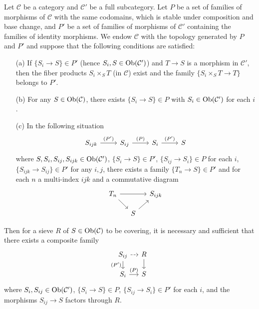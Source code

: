 \begin{proposition}\label{site topology generated by refining family prop}
Let $\mathcal{C}$ be a category and $\mathcal{C}'$ be a full subcategory. Let $P$ be a set of families of morphisms of $\mathcal{C}$ with the same codomains, which is stable under composition and base change, and $P'$ be a set of families of morphisms of $\mathcal{C}'$ containing the families of identity morphisms. We endow $\mathcal{C}$ with the topology generated by $P$ and $P'$ and suppose that the following conditions are satisfied:
\begin{enumerate}
    \item[(a)] If $\{S_i\to S\}\in P'$ (hence $S_i,S\in\mathrm{Ob}(\mathcal{C}')$) and $T\to S$ is a morphism in $\mathcal{C}'$, then the fiber products $S_i\times_ST$ (in $\mathcal{C}$) exist and the family $\{S_i\times_ST\to T\}$ belongs to $P'$.
    \item[(b)] For any $S\in\mathrm{Ob}(\mathcal{C})$, there exists $\{S_i\to S\}\in P$ with $S_i\in\mathrm{Ob}(\mathcal{C}')$ for each $i$.
    \item[(c)] In the following situation
    \[\begin{tikzcd}
    S_{ijk}\ar[r,"(P')"]&S_{ij}\ar[r,"(P)"]&S_i\ar[r,"(P')"]&S
    \end{tikzcd}\]
    where $S,S_i,S_{ij},S_{ijk}\in\mathrm{Ob}(\mathcal{C}')$, $\{S_i\to S\}\in P'$, $\{S_{ij}\to S_i\}\in P$ for each $i$, $\{S_{ijk}\to S_{ij}\}\in P'$ for any $i,j$, there exists a family $\{T_n\to S\}\in P'$ and for each $n$ a multi-index $ijk$ and a commutative diagram
    \[\begin{tikzcd}[row sep=4mm, column sep=4mm]
    T_n\ar[rd]\ar[rr]&&S_{ijk}\\
    &S\ar[ru]&
    \end{tikzcd}\]
\end{enumerate}
Then for a sieve $R$ of $S\in\mathrm{Ob}(\mathcal{C})$ to be covering, it is necessary and sufficient that there exists a composite family
\begin{equation}\label{site topology generated by refining family prop-1}
\begin{tikzcd}[row sep=4mm, column sep=4mm]
S_{ij}\ar[d,swap,"(P')"]\ar[r,dashed]&R\ar[d]\\
S_i\ar[r,"(P)"]&S
\end{tikzcd}
\end{equation}
where $S_i,S_{ij}\in\mathrm{Ob}(\mathcal{C}')$, $\{S_i\to S\}\in P$, $\{S_{ij}\to S_i\}\in P'$ for each $i$, and the morphisms $S_{ij}\to S$ factors through $R$.
\end{proposition}
